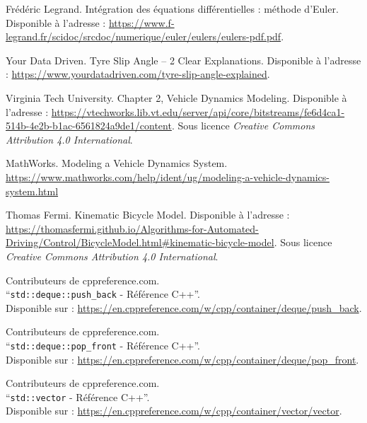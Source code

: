 \documentclass[a4paper,12pt]{report}
\begin{document}
    \begin{thebibliography}{9}
        Frédéric Legrand.
        Intégration des équations différentielles : méthode d'Euler.
        Disponible à l'adresse : \url{https://www.f-legrand.fr/scidoc/srcdoc/numerique/euler/eulers/eulers-pdf.pdf}.

        Your Data Driven.
        Tyre Slip Angle – 2 Clear Explanations.
        Disponible à l'adresse : \url{https://www.yourdatadriven.com/tyre-slip-angle-explained}.

        Virginia Tech University.
        Chapter 2, Vehicle Dynamics Modeling.
        Disponible à l'adresse : \url{https://vtechworks.lib.vt.edu/server/api/core/bitstreams/fe6d4ca1-514b-4e2b-b1ac-6561824a9de1/content}.
        Sous licence \textit{Creative Commons Attribution 4.0 International}.

        MathWorks.
        Modeling a Vehicle Dynamics System.
        \url{https://www.mathworks.com/help/ident/ug/modeling-a-vehicle-dynamics-system.html}

        Thomas Fermi.
        Kinematic Bicycle Model.
        Disponible à l'adresse : \url{https://thomasfermi.github.io/Algorithms-for-Automated-Driving/Control/BicycleModel.html#kinematic-bicycle-model}.
        Sous licence \textit{Creative Commons Attribution 4.0 International}.

        Contributeurs de cppreference.com. \\
        ``\texttt{std::deque::push\_back} - Référence C++''. \\
        Disponible sur : \url{https://en.cppreference.com/w/cpp/container/deque/push_back}.

        Contributeurs de cppreference.com.\\
        ``\texttt{std::deque::pop\_front} - Référence C++''.\\
        Disponible sur : \url{https://en.cppreference.com/w/cpp/container/deque/pop_front}.

        Contributeurs de cppreference.com.\\
        ``\texttt{std::vector} - Référence C++''.\\
        Disponible sur : \url{https://en.cppreference.com/w/cpp/container/vector/vector}.


\end{thebibliography}
\end{document}
